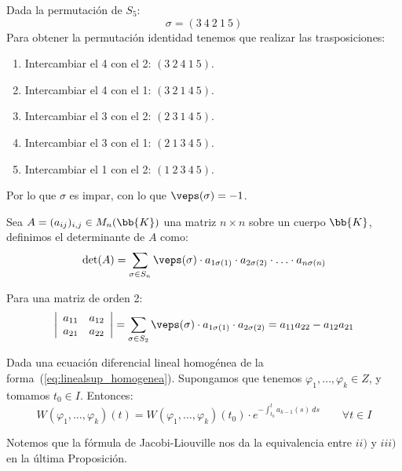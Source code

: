 \begin{ejemplo}
    Dada la permutación de $S_5$:
    \begin{equation*}
        \sigma = (3\ 4\ 2\ 1\ 5)
    \end{equation*}
    Para obtener la permutación identidad tenemos que realizar las trasposiciones:
    \begin{enumerate}
        \item Intercambiar el 4 con el 2: $(3\ 2\ 4\ 1\ 5)$.
        \item Intercambiar el 4 con el 1: $(3\ 2\ 1\ 4\ 5)$.
        \item Intercambiar el 3 con el 2: $(2\ 3\ 1\ 4\ 5)$.
        \item Intercambiar el 3 con el 1: $(2\ 1\ 3\ 4\ 5)$.
        \item Intercambiar el 1 con el 2: $(1\ 2\ 3\ 4\ 5)$.
    \end{enumerate}
    Por lo que $\sigma$ es impar, con lo que $\veps(\sigma)=-1$.
\end{ejemplo}

\begin{definicion}
    Sea $A=(a_{ij})_{i,j} \in M_n(\bb{K})$ una matriz $n\times n$ sobre un cuerpo $\bb{K}$, definimos el determinante de $A$ como:
    \begin{equation*}
        \det(A) = \sum_{\sigma\in S_n} \veps(\sigma)\cdot  a_{1\sigma(1)}\cdot a_{2\sigma(2)}\cdot \ldots \cdot a_{n\sigma(n)}
    \end{equation*}
\end{definicion}
\begin{ejemplo}
    Para una matriz de orden 2:
    \begin{equation*}
        \left|\begin{array}{cc}
            a_{11} & a_{12} \\
            a_{21} & a_{22}
        \end{array}\right| = \sum_{\sigma\in S_2} \veps(\sigma)\cdot a_{1\sigma(1)}\cdot a_{2\sigma(2)} = a_{11}a_{22} - a_{12}a_{21}
    \end{equation*}
\end{ejemplo}

\begin{teo}
Dada una ecuación diferencial lineal homogénea de la forma~(\ref{eq:linealsup_homogenea}). Supongamos que tenemos $\varphi_1,\ldots,\varphi_k\in Z$, y tomamos $t_0\in I$. Entonces:
\begin{equation*}
    W(\varphi_1,\ldots,\varphi_k)(t) = W(\varphi_1,\ldots,\varphi_k)(t_0) \cdot e^{\displaystyle-\int_{t_0}^{t} a_{k-1}(s)~ds } \qquad \forall t\in I
\end{equation*}
\end{teo}
Notemos que la fórmula de Jacobi-Liouville nos da la equivalencia entre $ii)$ y $iii)$ en la última Proposición.

